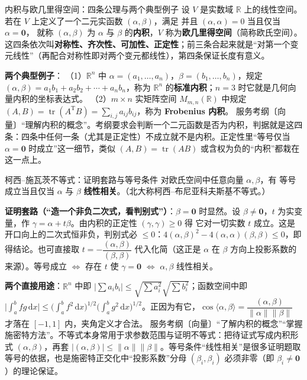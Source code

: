\begin{fdeep}{内积与欧几里得空间：四条公理与两个典型例子}
设 $V$ 是实数域 $\mathbb{R}$ 上的线性空间。若在 $V$ 上定义了一个二元实函数 $(\alpha,\beta)$，满足
并且 $(\alpha,\alpha)=0$ 当且仅当 $\alpha=\mathbf{0}$，
就称 $(\alpha,\beta)$ 为 $\alpha$ 与 $\beta$ 的\textbf{内积}，$V$ 称为\textbf{欧几里得空间}（简称欧氏空间）。这四条依次叫\textbf{对称性、齐次性、可加性、正定性}；前三条合起来就是“对第一个变元线性”（再配合对称性即对两个变元都线性），第四条保证长度有意义。

\textbf{两个典型例子}：
（1）$\mathbb{R}^n$ 中 $\alpha=(a_1,\dots,a_n)$，$\beta=(b_1,\dots,b_n)$，规定 $(\alpha,\beta)=a_1b_1+a_2b_2+\cdots+a_nb_n$，称为 $\mathbb{R}^n$ 的\textbf{标准内积}；$n=3$ 时它就是几何向量内积的坐标表达式。
（2）$m\times n$ 实矩阵空间 $M_{m,n}(\mathbb{R})$ 中规定 $(A,B)=\operatorname{tr}(A^{\mathrm T}B)=\sum_{i,j}a_{ij}b_{ij}$，称为 \textbf{Frobenius 内积}。
\fbref{}服务考纲〔向量〕“理解内积的概念”。考纲要求会判断一个二元函数是否为内积，判据就是这四条：四条中任何一条（尤其是正定性）不成立就不是内积。正定性里“等号仅当 $\alpha=\mathbf{0}$ 时成立”这一细节，类似 $(A,B)=\operatorname{tr}(AB)$ 或含权为负的“内积”都栽在这一点上。
\end{fdeep}

\begin{fdeep}{柯西–施瓦茨不等式：证明套路与等号条件}
对欧氏空间中任意向量 $\alpha,\beta$，有
\fml{\lvert(\alpha,\beta)\rvert\le\lVert\alpha\rVert\,\lVert\beta\rVert}
等号成立当且仅当 $\alpha$ 与 $\beta$ \textbf{线性相关}。（北大称柯西–布尼亚科夫斯基不等式。）

\textbf{证明套路（“造一个非负二次式，看判别式”）}：$\beta=\mathbf{0}$ 时显然。设 $\beta\ne\mathbf{0}$，$t$ 为实变量，作 $\gamma=\alpha+t\beta$。由内积的正定性 $(\gamma,\gamma)\ge0$ 得
它对一切实数 $t$ 成立。这是开口向上的二次式恒非负，判别式必 $\le0$：$4(\alpha,\beta)^2-4(\alpha,\alpha)(\beta,\beta)\le0$，即得结论。也可直接取 $t=-\dfrac{(\alpha,\beta)}{(\beta,\beta)}$ 代入化简（这正是 $\alpha$ 在 $\beta$ 方向上投影系数的来源）。等号成立 $\iff$ 存在 $t$ 使 $\gamma=\mathbf{0}$ $\iff$ $\alpha,\beta$ 线性相关。

\textbf{两个直接用途}：$\mathbb{R}^n$ 中即 $\lvert\sum a_ib_i\rvert\le\sqrt{\sum a_i^2}\sqrt{\sum b_i^2}$；函数空间中即 $\lvert\int_a^b fg\,\mathrm{d}x\rvert\le\bigl(\int_a^b f^2\,\mathrm{d}x\bigr)^{1/2}\bigl(\int_a^b g^2\,\mathrm{d}x\bigr)^{1/2}$。正因为有它，$\cos\langle\alpha,\beta\rangle=\dfrac{(\alpha,\beta)}{\lVert\alpha\rVert\lVert\beta\rVert}$ 才落在 $[-1,1]$ 内，夹角定义才合法。
\fbref{}服务考纲〔向量〕“了解内积的概念”“掌握施密特方法”。不等式本身常用于求参数范围与证明不等式：把待证式写成内积形式 $(\alpha,\beta)$，再套 $\lvert(\alpha,\beta)\rvert\le\lVert\alpha\rVert\lVert\beta\rVert$。等号条件“线性相关”是很多证明题取等号的依据，也是施密特正交化中“投影系数”分母 $(\beta_i,\beta_i)$ 必须非零（即 $\beta_i\ne\mathbf{0}$）的理论保证。
\end{fdeep}

